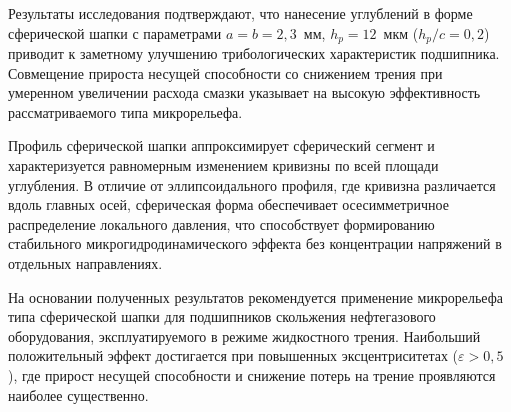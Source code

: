 Результаты исследования подтверждают, что нанесение углублений в форме сферической шапки с параметрами $a = b = 2{,}3$~мм, $h_p = 12$~мкм ($h_p/c = 0{,}2$) приводит к заметному улучшению трибологических характеристик подшипника. Совмещение прироста несущей способности со снижением трения при умеренном увеличении расхода смазки указывает на высокую эффективность рассматриваемого типа микрорельефа.

Профиль сферической шапки аппроксимирует сферический сегмент и характеризуется равномерным изменением кривизны по всей площади углубления. В отличие от эллипсоидального профиля, где кривизна различается вдоль главных осей, сферическая форма обеспечивает осесимметричное распределение локального давления, что способствует формированию стабильного микрогидродинамического эффекта без концентрации напряжений в отдельных направлениях.

На основании полученных результатов рекомендуется применение микрорельефа типа сферической шапки для подшипников скольжения нефтегазового оборудования, эксплуатируемого в режиме жидкостного трения. Наибольший положительный эффект достигается при повышенных эксцентриситетах ($\varepsilon > 0{,}5$), где прирост несущей способности и снижение потерь на трение проявляются наиболее существенно.
